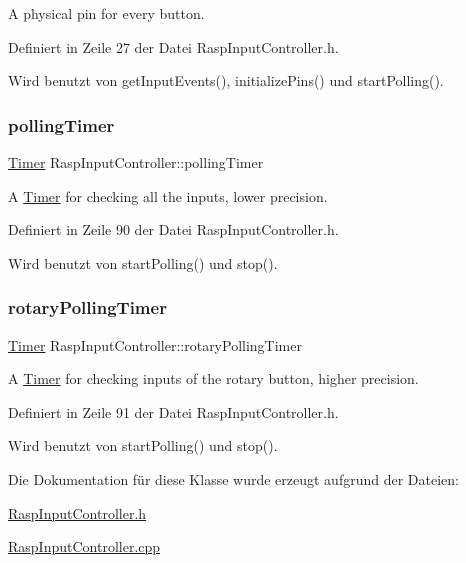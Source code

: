 A physical pin for every button. 



Definiert in Zeile 27 der Datei Rasp\+Input\+Controller.\+h.



Wird benutzt von get\+Input\+Events(), initialize\+Pins() und start\+Polling().

\mbox{\label{class_rasp_input_controller_a388779c1ddf9f5910a92cd350cc59e5c}} 
\subsubsection{\texorpdfstring{polling\+Timer}{pollingTimer}}
{\footnotesize\ttfamily \hyperlink{class_timer}{Timer} Rasp\+Input\+Controller\+::polling\+Timer\hspace{0.3cm}{\ttfamily [private]}}



A \hyperlink{class_timer}{Timer} for checking all the inputs, lower precision. 



Definiert in Zeile 90 der Datei Rasp\+Input\+Controller.\+h.



Wird benutzt von start\+Polling() und stop().

\mbox{\label{class_rasp_input_controller_a55b065ae154806341fd900a8b61110a5}} 
\subsubsection{\texorpdfstring{rotary\+Polling\+Timer}{rotaryPollingTimer}}
{\footnotesize\ttfamily \hyperlink{class_timer}{Timer} Rasp\+Input\+Controller\+::rotary\+Polling\+Timer\hspace{0.3cm}{\ttfamily [private]}}



A \hyperlink{class_timer}{Timer} for checking inputs of the rotary button, higher precision. 



Definiert in Zeile 91 der Datei Rasp\+Input\+Controller.\+h.



Wird benutzt von start\+Polling() und stop().



Die Dokumentation für diese Klasse wurde erzeugt aufgrund der Dateien\+:\begin{DoxyCompactItemize}
\item 
\hyperlink{_rasp_input_controller_8h}{Rasp\+Input\+Controller.\+h}\item 
\hyperlink{_rasp_input_controller_8cpp}{Rasp\+Input\+Controller.\+cpp}\end{DoxyCompactItemize}
